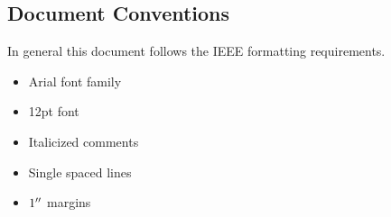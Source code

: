     \subsection{Document Conventions}\label{sec:document-conventions}
        In general this document follows the IEEE formatting requirements.
            \begin{itemize}
                \item Arial font family
                \item 12pt font
                \item Italicized comments
                \item Single spaced lines
                \item $1^{\prime\prime}$ margins
            \end{itemize}
